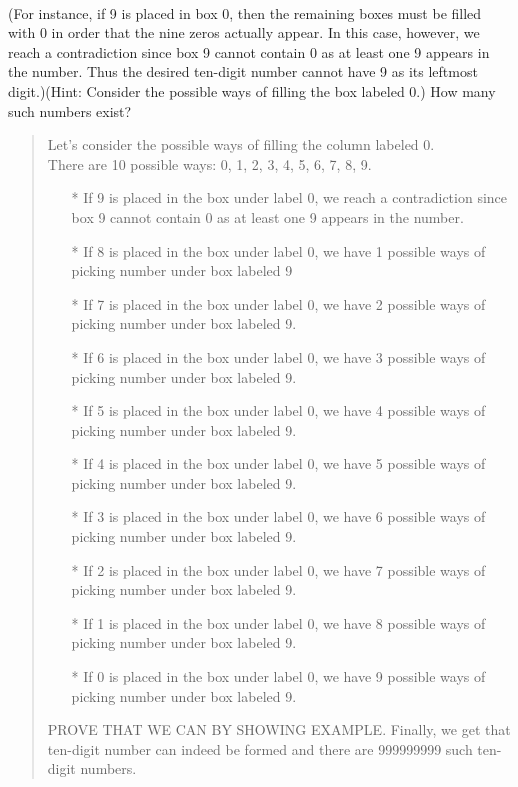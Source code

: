 \documentclass[12pt, a4paper]{article}                      %
\begin{document}
\begin{itemize}
\begin{table}[h!]
\begin{adjustbox}{max width=\textwidth}
{    }
	\end{adjustbox}
\end{table}
\\
(For instance, if 9 is placed in box 0, then the remaining boxes must be filled with
0 in order that the nine zeros actually appear. In this case, however, we reach a contradiction
since box 9 cannot contain 0 as at least one 9 appears in the number. Thus the desired ten-digit
number cannot have 9 as its leftmost digit.)(Hint: Consider the possible ways of filling the box
labeled 0.) How many such numbers exist?
\begin{quote}
Let's consider the possible ways of filling the column labeled 0.\\
There are 10 possible ways: 0, 1, 2, 3, 4, 5, 6, 7, 8, 9.
\\
\begin{itemize}
\item[*]
If 9 is placed in the box under label 0, we reach a contradiction since box 9 cannot contain 0 as at least one 9 appears in the number.
\item[*]
If 8 is placed in the box under label 0, we have 1 possible ways of picking number under box labeled 9
\item[*]
If 7 is placed in the box under label 0, we have 2 possible ways of picking number under box labeled 9.
\item[*]
If 6 is placed in the box under label 0, we have 3 possible ways of picking number under box labeled 9.
\item[*]
If 5 is placed in the box under label 0, we have 4 possible ways of picking number under box labeled 9.
\item[*]
If 4 is placed in the box under label 0, we have 5 possible ways of picking number under box labeled 9.
\item[*]
If 3 is placed in the box under label 0, we have 6 possible ways of picking number under box labeled 9.
\item[*]
If 2 is placed in the box under label 0, we have 7 possible ways of picking number under box labeled 9.
\item[*]
If 1 is placed in the box under label 0, we have 8 possible ways of picking number under box labeled 9.
\item[*]
If 0 is placed in the box under label 0, we have 9 possible ways of picking number under box labeled 9.
\end{itemize}
PROVE THAT WE CAN BY SHOWING EXAMPLE.
Finally, we get that ten-digit number can indeed be formed and there are 999999999 such ten-digit numbers.
\end{quote}
\end{itemize}
\end{document}
